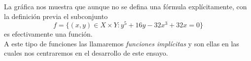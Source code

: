 La gráfica nos muestra que aunque no se defina una fórmula explícitamente, con la definición previa el subconjunto $$f=\{(x,y)\in X\times Y: y^5+16y-32x^3+32x=0\}$$ es efectivamente una función. \\A este tipo de funciones las llamaremos \textit{funciones implícitas} y son ellas en las cuales nos centraremos en el desarrollo de este ensayo.
